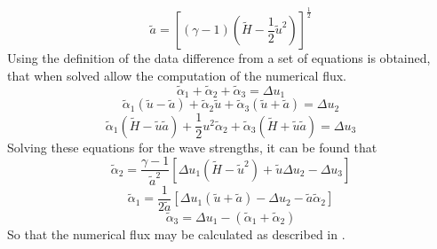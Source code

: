 \begin{equation}
	\tilde{a} = \left[\left(\gamma - 1\right) \left(\tilde{H} - \frac{1}{2} \tilde{u}^2\right)\right]^{\frac{1}{2}}
\end{equation}
Using the definition of the data difference from  a set of equations is obtained, that when solved allow the computation of the numerical flux.
\begin{equation}
	\tilde{\alpha}_1 + \tilde{\alpha}_2 + \tilde{\alpha}_3 = \Delta u_1
\end{equation}
\begin{equation}
	\tilde{\alpha}_1 \left(\tilde{u} - \tilde{a}\right) + \tilde{\alpha}_2 \tilde{u} + \tilde{\alpha}_3 \left(\tilde{u} + \tilde{a}\right) = \Delta u_2
\end{equation}
\begin{equation}
	\tilde{\alpha}_1 \left(\tilde{H} - \tilde{u}\tilde{a}\right) + \frac{1}{2} u^2 \tilde{\alpha}_2 + \tilde{\alpha}_3 \left(\tilde{H} + \tilde{u}\tilde{a}\right) = \Delta u_3
\end{equation}
Solving these equations for the wave strengths, it can be found that
\begin{equation}
	\tilde{\alpha}_2 = \frac{\gamma - 1}{\tilde{a}^2} \left[\Delta u_1 \left(\tilde{H} - \tilde{u}^2\right)  + \tilde{u} \Delta u_2 - \Delta u_3\right]
\end{equation}
\begin{equation}
	\tilde{\alpha}_1 = \frac{1}{2 \tilde{a}} \left[\Delta u_1\left(\tilde{u} + \tilde{a}\right) - \Delta u_2 - \tilde{a}\tilde{\alpha}_2\right]
\end{equation}
\begin{equation}\label{eq:wavestrength3}
	\tilde{\alpha}_3 = \Delta u_1 - \left(\tilde{\alpha}_1 + \tilde{\alpha}_2\right)
\end{equation}
So that the numerical flux may be calculated as described in .

